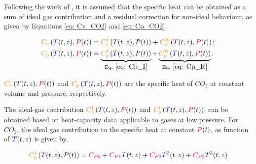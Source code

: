\documentclass[../Article_Model_Parameters.tex]{subfiles}
\begin{document}
	Following the work of \citet{Pratt2001}, it is assumed that the specific heat can be obtained as a sum of ideal gas contribution and a residual correction for non-ideal behaviour, as given by Equations \ref{eq: Cv_CO2} and \ref{eq: Cp_CO2}.
	
	{\footnotesize
	\begin{subequations}\begin{align}
			{\color{orange}C_v}\left({\color{blue}T}(t,z), {\color{red}P}(t)\right) & = {\color{orange}C_v^{\text{I}}}\left({\color{blue}T}(t,z),P(t)\right) + {\color{orange}C_v^{\text{R}}}\left({\color{blue}T}(t,z), {\color{red}P}(t)\right) \label{eq: Cv_CO2}; \\ 
			{\color{orange}C_p}\left({\color{blue}T}(t,z), {\color{red}P}(t)\right) & = \underbrace{{\color{orange}C_p^{\text{I}}}\left({\color{blue}T}(t,z),P(t)\right)}_{\text{Eq. } \eqref{eq: Cp_I}} + \underbrace{{\color{orange}C_p^{\text{R}}}\left({\color{blue}T}(t,z), {\color{red}P}(t)\right)}_{\text{Eq. } \eqref{eq: Cp_R}}  \label{eq: Cp_CO2}.
	\end{align}\end{subequations} }

	${\color{orange}C_v}\left({\color{blue}T}(t,z), {\color{red}P}(t)\right)$ and ${\color{orange}C_p}\left({\color{blue}T}(t,z), {\color{red}P}(t)\right)$ are the specific heat of $CO_2$ at constant volume and pressure, respectively. 
	
	The ideal-gas contribution ${\color{orange}C_v^{\text{I}}}\left({\color{blue}T}(t,z), {\color{red}P}(t)\right)$ and ${\color{orange}C_p^{\text{I}}}\left({\color{blue}T}(t,z), {\color{red}P}(t)\right)$, can be obtained based on heat-capacity data applicable to gases at low pressure. For $CO_2$, the ideal gas contribution to the specific heat at constant ${\color{red}P}(t)$, as function of ${\color{blue}T}(t,z)$ is given by,
	
	{\footnotesize
	\begin{equation}
		{\color{orange}C_p^{\text{I}}}\left({\color{blue}T}(t,z),P(t)\right) = {\color{magenta}C_{P0}} + {\color{magenta}C_{P1}}T(t,z) + {\color{magenta}C_{P2}}{\color{blue}T}^2(t,z) + {\color{magenta}C_{P3}}{\color{blue}T}^3(t,z) \label{eq: Cp_I}
	\end{equation} }
\end{document}
